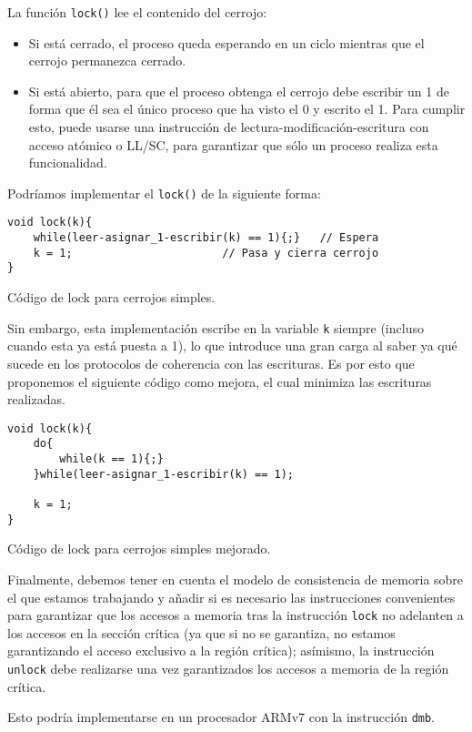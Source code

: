 La función \verb|lock()| lee el contenido del cerrojo:
\begin{itemize}
    \item Si está cerrado, el proceso queda esperando en un ciclo mientras que el cerrojo permanezca cerrado.
    \item Si está abierto, para que el proceso obtenga el cerrojo debe escribir un 1 de forma que él sea el único proceso que ha visto el 0 y escrito el 1. Para cumplir esto, puede usarse una instrucción de lectura-modificación-escritura con acceso atómico o LL/SC, para garantizar que sólo un proceso realiza esta funcionalidad.
\end{itemize}
Podríamos implementar el \verb|lock()| de la siguiente forma:
\begin{listing}[H]
\begin{verbatim}
void lock(k){
    while(leer-asignar_1-escribir(k) == 1){;}   // Espera
    k = 1;                       // Pasa y cierra cerrojo
}
\end{verbatim}
\caption{Código de lock para cerrojos simples.}
\label{lock_cerrojos_simples}
\end{listing}
Sin embargo, esta implementación escribe en la variable \verb|k| siempre (incluso cuando esta ya está puesta a 1), lo que introduce una gran carga al saber ya qué sucede en los protocolos de coherencia con las escrituras. Es por esto que proponemos el siguiente código como mejora, el cual minimiza las escrituras realizadas.
\begin{listing}[H]
\begin{verbatim}
void lock(k){
    do{
        while(k == 1){;}
    }while(leer-asignar_1-escribir(k) == 1);

    k = 1;
}
\end{verbatim}
\caption{Código de lock para cerrojos simples mejorado.}
\label{lock_cerrojos_simples_mejor}
\end{listing}
Finalmente, debemos tener en cuenta el modelo de consistencia de memoria sobre el que estamos trabajando y añadir si es necesario las instrucciones convenientes para garantizar que los accesos a memoria tras la instrucción \verb|lock| no adelanten a los accesos en la sección crítica (ya que si no se garantiza, no estamos garantizando el acceso exclusivo a la región crítica); asímismo, la instrucción \verb|unlock| debe realizarse una vez garantizados los accesos a memoria de la región crítica. 

Esto podría implementarse en un procesador ARMv7 con la instrucción \verb|dmb|.

